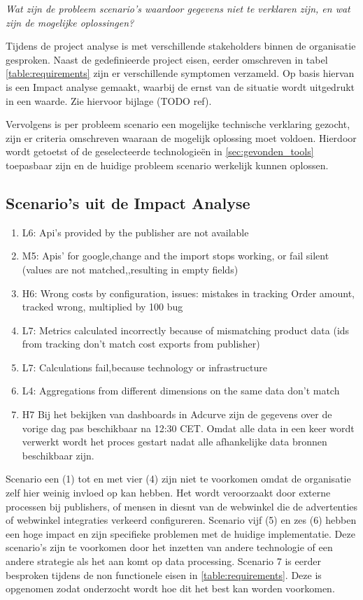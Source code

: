 \textit{Wat zijn de probleem scenario's waardoor gegevens niet te verklaren zijn, en wat zijn de mogelijke oplossingen?}

Tijdens de project analyse is met verschillende stakeholders binnen de organisatie gesproken. Naast de gedefinieerde project eisen, eerder omschreven in tabel \ref{table:requirements} zijn er verschillende symptomen verzameld. Op basis hiervan is een Impact analyse gemaakt, waarbij de ernst van de situatie wordt uitgedrukt in een waarde. Zie hiervoor bijlage (TODO ref).

Vervolgens is per probleem scenario een mogelijke technische verklaring gezocht, zijn er criteria omschreven waaraan de mogelijk oplossing moet voldoen. Hierdoor wordt getoetst of de geselecteerde technologieën in  \ref{sec:gevonden_tools} toepasbaar zijn en de huidige probleem scenario werkelijk kunnen oplossen.

\subsection{Scenario's uit de Impact Analyse}


\begin{enumerate}
    \item L6: Api's provided by the publisher are not available
    \item M5: Apis' for google,change and the import stops working, or fail silent (values are not matched,,resulting in empty fields)
    \item H6: Wrong costs by configuration, issues: mistakes in tracking Order amount, tracked wrong, multiplied by 100 bug
    \item L7: Metrics calculated incorrectly because of mismatching product data (ids from tracking don't match cost exports from publisher)
    \item L7: Calculations fail,because technology or infrastructure 
    \item L4: Aggregations from different dimensions on the same data
    don't match
    \item H7 Bij het bekijken van dashboards in Adcurve zijn de gegevens over de vorige dag pas beschikbaar na 12:30 CET. Omdat alle data in een keer wordt verwerkt wordt het proces gestart nadat alle afhankelijke data bronnen beschikbaar zijn.
\end{enumerate}

Scenario een (1) tot en met vier (4) zijn niet te voorkomen omdat de organisatie zelf hier weinig invloed op kan hebben. Het wordt veroorzaakt door externe processen bij publishers, of mensen in diesnt van de webwinkel die de advertenties of webwinkel integraties verkeerd configureren. Scenario vijf (5) en zes (6) hebben een hoge impact en zijn specifieke problemen met de huidige implementatie. Deze scenario's zijn te voorkomen door het inzetten van andere technologie of een andere strategie als het aan komt op data processing.
Scenario 7 is eerder besproken tijdens de non functionele eisen in \ref{table:requirements}. Deze is opgenomen zodat onderzocht wordt hoe dit het best kan worden voorkomen.  


